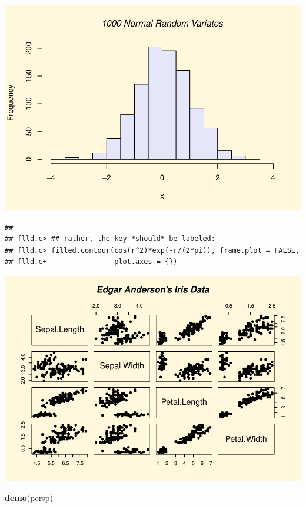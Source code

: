 \documentclass[
]{book}
\newenvironment{Shaded}{\begin{snugshade}}{\end{snugshade}}
\newcommand{\KeywordTok}[1]{\textcolor[rgb]{0.13,0.29,0.53}{\textbf{#1}}}
\newcommand{\NormalTok}[1]{#1}
\begin{document}
\includegraphics{TudodoR_files/figure-latex/unnamed-chunk-147-7.pdf}

\begin{verbatim}
## 
## flld.c> ## rather, the key *should* be labeled:
## flld.c> filled.contour(cos(r^2)*exp(-r/(2*pi)), frame.plot = FALSE,
## flld.c+                plot.axes = {})
\end{verbatim}

\includegraphics{TudodoR_files/figure-latex/unnamed-chunk-147-8.pdf}

\begin{Shaded}
\begin{Highlighting}[]
\KeywordTok{demo}\NormalTok{(persp)}
\end{Highlighting}
\end{Shaded}
\end{document}
